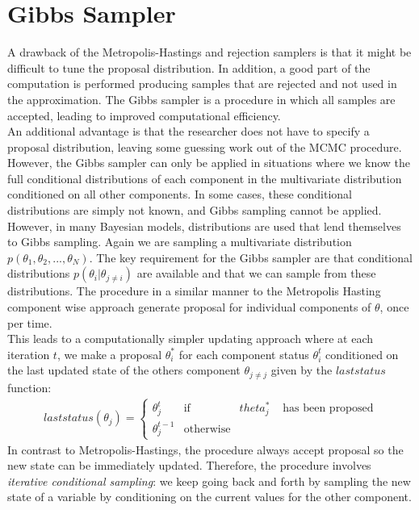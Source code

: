 \section{Gibbs Sampler}
A drawback of the Metropolis-Hastings and rejection samplers is that it might be difficult
to tune the proposal distribution. In addition, a good part of the computation is performed
producing samples that are rejected and not used in the approximation. The Gibbs sampler
is a procedure in which all samples are accepted, leading to improved computational efficiency. \\
An additional advantage is that the researcher does not have to specify a proposal distribution, leaving some guessing work out of the MCMC procedure.\\
However, the Gibbs sampler can only be applied in situations where we know the full
conditional distributions of each component in the multivariate distribution conditioned on
all other components. In some cases, these conditional distributions are simply not known,
and Gibbs sampling cannot be applied. 
However, in many Bayesian models, distributions are used that lend themselves to Gibbs sampling.
Again we are sampling a multivariate distribution $p(\theta_1 , \theta_2, ...,\theta_N)$.
The key requirement for the Gibbs sampler are that  conditional distributions $p(\theta_i |\theta_{j \neq i} )$ are available and that we can sample from these distributions.
The procedure in a similar manner to the Metropolis Hasting component wise approach generate proposal for individual components of $\theta$, once per time.\\
This leads to a  computationally simpler updating approach where at each iteration $t$, we  make a proposal $\theta_i^*$ for each component status $\theta_i^t$ conditioned on the last updated state of the others component  $\theta_{j \neq j}$ given by the $laststatus$ function:
\begin{eqnarray} \label{eqn: lastsatus}
laststatus(\theta_j) = \left\{
\begin{array}{cccc}
 \theta_j^t  & \mbox{if} & theta_j^* & \mbox{ has been proposed} \\
 \theta_j^{t-1}  & \mbox{otherwise} & &
\end{array}
\right.
\end{eqnarray}
In contrast to Metropolis-Hastings, the procedure always accept proposal so the new state can be immediately updated. Therefore, the procedure involves \textit{iterative conditional sampling}: we keep going back and forth by sampling the new state of a variable by conditioning on the current values for the other component. 
